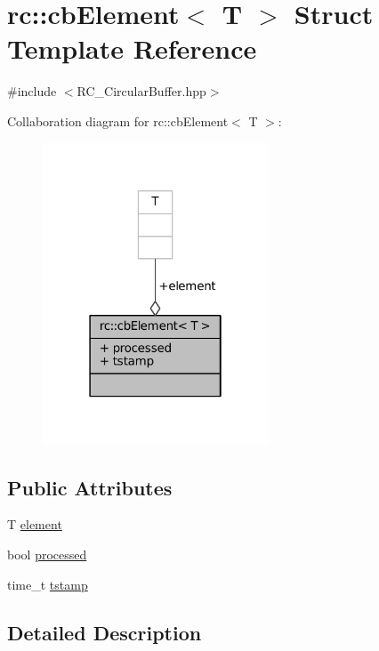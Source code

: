 \hypertarget{structrc_1_1cbElement}{\section{rc\+:\+:cb\+Element$<$ T $>$ Struct Template Reference}
\label{structrc_1_1cbElement}
}


{\ttfamily \#include $<$R\+C\+\_\+\+Circular\+Buffer.\+hpp$>$}



Collaboration diagram for rc\+:\+:cb\+Element$<$ T $>$\+:\nopagebreak
\begin{figure}[H]
\begin{center}
\leavevmode
\includegraphics[width=190pt]{structrc_1_1cbElement__coll__graph}
\end{center}
\end{figure}
\subsection*{Public Attributes}
\begin{DoxyCompactItemize}
\item 
T \hyperlink{structrc_1_1cbElement_a9e0ab0b1cc53698c5aedf11997ffd261}{element}
\item 
bool \hyperlink{structrc_1_1cbElement_a721d493bd93248172628c48c4526f105}{processed}
\item 
time\+\_\+t \hyperlink{structrc_1_1cbElement_a96732c8c547c6cf61082007d4e31e4d7}{tstamp}
\end{DoxyCompactItemize}


\subsection{Detailed Description}
